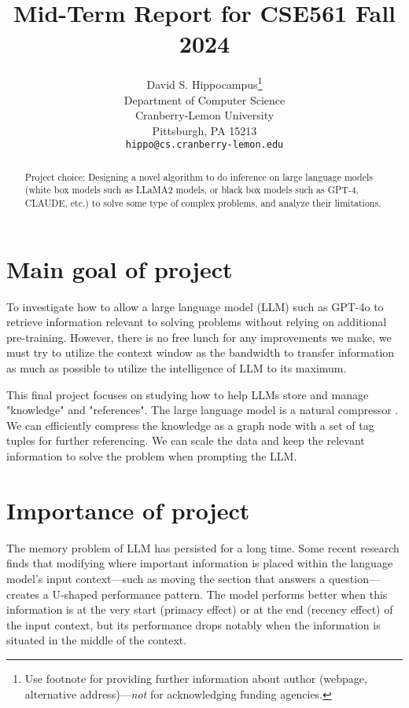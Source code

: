 \documentclass{article}
\title{Mid-Term Report for CSE561 Fall 2024}
\author{%
  David S. Hippocampus\thanks{Use footnote for providing further information
    about author (webpage, alternative address)---\emph{not} for acknowledging
    funding agencies.} \\
  Department of Computer Science\\
  Cranberry-Lemon University\\
  Pittsburgh, PA 15213 \\
  \texttt{hippo@cs.cranberry-lemon.edu} \\
}
\begin{document}
\maketitle


\begin{abstract}

Project choice: Designing a novel algorithm to do inference on large language models (white box models such as LLaMA2 models, or black box models such as GPT-4, CLAUDE, etc.) to solve some type of complex problems, and analyze their limitations.

\end{abstract}


\section{Main goal of project}

To investigate how to allow a large language model (LLM) such as GPT-4o to retrieve information relevant to solving problems without relying on additional pre-training. However, there is no free lunch for any improvements we make, we must try to utilize the context window as the bandwidth to transfer information as much as possible to utilize the intelligence of LLM to its maximum.

This final project focuses on studying how to help LLMs store and manage "knowledge" and "references". The large language model is a natural compressor \cite{delétang2024languagemodelingcompression}. We can efficiently compress the knowledge as a graph node with a set of tag tuples for further referencing. We can scale the data and keep the relevant information to solve the problem when prompting the LLM.

\section{Importance of project}

The memory problem of LLM has persisted for a long time. Some recent research finds that modifying where important information is placed within the language model’s input context—such as moving the section that answers a question—creates a U-shaped performance pattern. The model performs better when this information is at the very start (primacy effect) or at the end (recency effect) of the input context, but its performance drops notably when the information is situated in the middle of the context. \cite{liu2023lostmiddlelanguagemodels}
\end{document}
